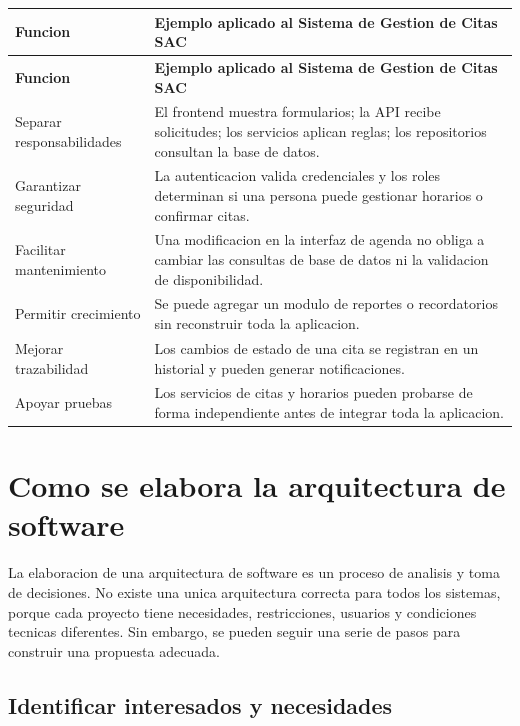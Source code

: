 \documentclass[12pt,letterpaper]{article}
\begin{document}
\begin{longtable}{|p{4cm}|p{10.5cm}|}
\hline
\textbf{Funcion} & \textbf{Ejemplo aplicado al Sistema de Gestion de Citas SAC} \\
\hline
\endfirsthead
\hline
\textbf{Funcion} & \textbf{Ejemplo aplicado al Sistema de Gestion de Citas SAC} \\
\hline
\endhead
\hline
\endfoot
\hline
\endlastfoot

Separar responsabilidades & El frontend muestra formularios; la API recibe solicitudes; los servicios aplican reglas; los repositorios consultan la base de datos. \\
\hline

Garantizar seguridad & La autenticacion valida credenciales y los roles determinan si una persona puede gestionar horarios o confirmar citas. \\
\hline

Facilitar mantenimiento & Una modificacion en la interfaz de agenda no obliga a cambiar las consultas de base de datos ni la validacion de disponibilidad. \\
\hline

Permitir crecimiento & Se puede agregar un modulo de reportes o recordatorios sin reconstruir toda la aplicacion. \\
\hline

Mejorar trazabilidad & Los cambios de estado de una cita se registran en un historial y pueden generar notificaciones. \\
\hline

Apoyar pruebas & Los servicios de citas y horarios pueden probarse de forma independiente antes de integrar toda la aplicacion. \\
\hline
\end{longtable}

\section{Como se elabora la arquitectura de software}

La elaboracion de una arquitectura de software es un proceso de analisis y toma de decisiones. No existe una unica arquitectura correcta para todos los sistemas, porque cada proyecto tiene necesidades, restricciones, usuarios y condiciones tecnicas diferentes. Sin embargo, se pueden seguir una serie de pasos para construir una propuesta adecuada.

\subsection{Identificar interesados y necesidades}
\end{document}
